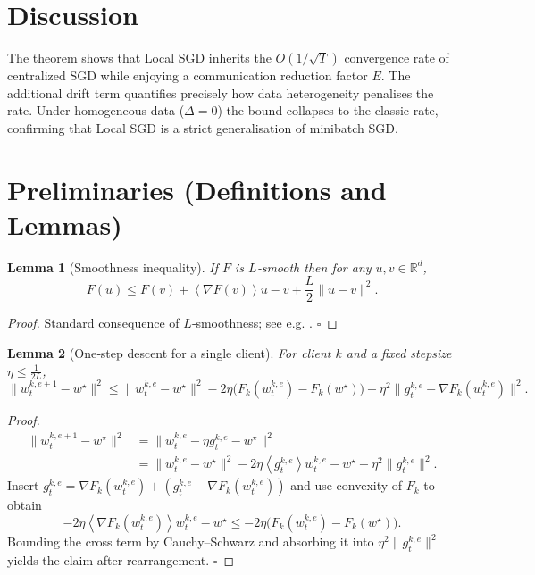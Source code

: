\documentclass[11pt]{article}
\newtheorem{lemma}{Lemma}
\newcommand{\R}{\mathbb{R}}
\newcommand{\inner}[1]{\left\langle #1\right\rangle}
\begin{document}
\section*{Discussion}
The theorem shows that Local SGD inherits the $O(1/\sqrt{T})$ convergence rate of centralized SGD while enjoying a communication reduction factor $E$.  The additional drift term quantifies precisely how data heterogeneity penalises the rate.  Under homogeneous data ($\Delta=0$) the bound collapses to the classic rate, confirming that Local SGD is a strict generalisation of minibatch SGD.

\newpage

\section*{Preliminaries (Definitions and Lemmas)}
\begin{lemma}[Smoothness inequality]\label{lem:smooth}
If $F$ is $L$‑smooth then for any $u,v\in\R^d$,
\[
F(u)\le F(v)+\inner{\nabla F(v)}{u-v}+\frac{L}{2}\|u-v\|^2 .
\]
\end{lemma}
\begin{proof}
Standard consequence of $L$‑smoothness; see e.g. \cite{nesterov2004introductory}. \hfill $\square$
\end{proof}

\begin{lemma}[One‑step descent for a single client]\label{lem:onestep}
For client $k$ and a fixed stepsize $\eta\le\frac1{2L}$,
\[
\|w_{t}^{k,e+1}-w^\star\|^2
\le
\|w_{t}^{k,e}-w^\star\|^2
-2\eta\big(F_k(w_{t}^{k,e})-F_k(w^\star)\big)
+\eta^2\|g_{t}^{k,e}-\nabla F_k(w_{t}^{k,e})\|^2 .
\]
\end{lemma}
\begin{proof}
\begin{align*}
\|w_{t}^{k,e+1}-w^\star\|^2
&=\|w_{t}^{k,e}-\eta g_{t}^{k,e}-w^\star\|^2\\
&=\|w_{t}^{k,e}-w^\star\|^2-2\eta\inner{g_{t}^{k,e}}{w_{t}^{k,e}-w^\star}
+\eta^2\|g_{t}^{k,e}\|^2 .
\end{align*}
Insert $g_{t}^{k,e}= \nabla F_k(w_{t}^{k,e})+(g_{t}^{k,e}-\nabla F_k(w_{t}^{k,e}))$ and use convexity of $F_k$ to obtain
\[
-2\eta\inner{\nabla F_k(w_{t}^{k,e})}{w_{t}^{k,e}-w^\star}
\le -2\eta\big(F_k(w_{t}^{k,e})-F_k(w^\star)\big).
\]
Bounding the cross term by Cauchy–Schwarz and absorbing it into $\eta^2\|g_{t}^{k,e}\|^2$ yields the claim after rearrangement. \hfill $\square$
\end{proof}
\end{document}
